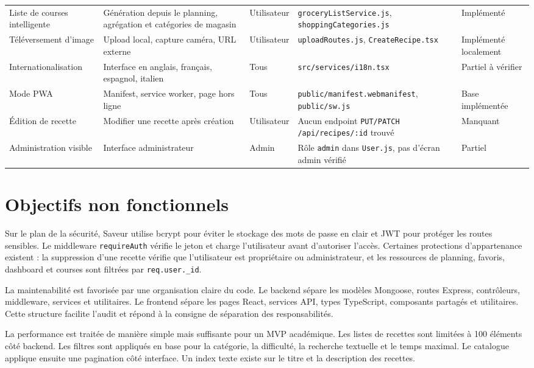 \documentclass[12pt,a4paper]{report}
\begin{document}
\begin{longtable}{p{2.5cm}p{3.7cm}p{2.3cm}p{3.9cm}p{2cm}}
Liste de courses intelligente & Génération depuis le planning, agrégation et catégories de magasin & Utilisateur & \texttt{groceryListService.js}, \texttt{shoppingCategories.js} & Implémenté \\
Téléversement d'image & Upload local, capture caméra, URL externe & Utilisateur & \texttt{uploadRoutes.js}, \texttt{CreateRecipe.tsx} & Implémenté localement \\
Internationalisation & Interface en anglais, français, espagnol, italien & Tous & \texttt{src/services/i18n.tsx} & Partiel à vérifier \\
Mode PWA & Manifest, service worker, page hors ligne & Tous & \texttt{public/manifest.webmanifest}, \texttt{public/sw.js} & Base implémentée \\
Édition de recette & Modifier une recette après création & Utilisateur & Aucun endpoint \texttt{PUT/PATCH /api/recipes/:id} trouvé & Manquant \\
Administration visible & Interface administrateur & Admin & Rôle \texttt{admin} dans \texttt{User.js}, pas d'écran admin vérifié & Partiel \\
\bottomrule
\end{longtable}

\section{Objectifs non fonctionnels}
Sur le plan de la sécurité, Saveur utilise bcrypt pour éviter le stockage des mots de passe en clair et JWT pour protéger les routes sensibles. Le middleware \texttt{requireAuth} vérifie le jeton et charge l'utilisateur avant d'autoriser l'accès. Certaines protections d'appartenance existent : la suppression d'une recette vérifie que l'utilisateur est propriétaire ou administrateur, et les ressources de planning, favoris, dashboard et courses sont filtrées par \texttt{req.user.\_id}.

La maintenabilité est favorisée par une organisation claire du code. Le backend sépare les modèles Mongoose, routes Express, contrôleurs, middleware, services et utilitaires. Le frontend sépare les pages React, services API, types TypeScript, composants partagés et utilitaires. Cette structure facilite l'audit et répond à la consigne de séparation des responsabilités.

La performance est traitée de manière simple mais suffisante pour un MVP académique. Les listes de recettes sont limitées à 100 éléments côté backend. Les filtres sont appliqués en base pour la catégorie, la difficulté, la recherche textuelle et le temps maximal. Le catalogue applique ensuite une pagination côté interface. Un index texte existe sur le titre et la description des recettes.
\end{document}
